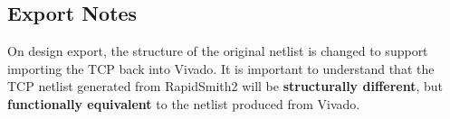 \subsection{Export Notes}
On design export, the structure of the original netlist is changed to support
importing the TCP back into Vivado. It is important to understand that the TCP
netlist generated from RapidSmith2 will be \textbf{structurally different}, but
\textbf{functionally equivalent} to the netlist produced from Vivado.
